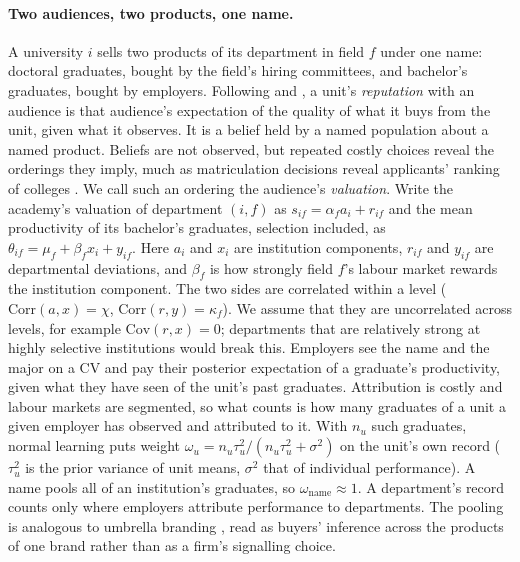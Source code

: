 \paragraph{Two audiences, two products, one name.} A university $i$ sells two products of its department in
field $f$ under one name: doctoral graduates, bought by the field's hiring committees, and bachelor's graduates,
bought by employers. Following \citet{macleod2015reputation} and \citet{tadelis1999name}, a unit's
\emph{reputation} with an audience is that audience's expectation of the quality of what it buys from the unit,
given what it observes. It is a belief held by a named population about a named product. Beliefs are not
observed, but repeated costly choices reveal the orderings they imply, much as matriculation decisions reveal
applicants' ranking of colleges \citep{avery2013revealed}. We call such an ordering the audience's
\emph{valuation}. Write the academy's valuation of department $(i,f)$ as $s_{if}=\alpha_fa_i+r_{if}$ and the mean
productivity of its bachelor's graduates, selection included, as $\theta_{if}=\mu_f+\beta_fx_i+y_{if}$. Here
$a_i$ and $x_i$ are institution components, $r_{if}$ and $y_{if}$ are departmental deviations, and $\beta_f$ is
how strongly field $f$'s labour market rewards the institution component. The two sides are correlated within a
level ($\mathrm{Corr}(a,x)=\chi$, $\mathrm{Corr}(r,y)=\kappa_f$). We assume that they are uncorrelated across
levels, for example $\mathrm{Cov}(r,x)=0$; departments that are relatively strong at highly selective
institutions would break this. Employers see the name and the major on a CV and pay their posterior expectation
of a graduate's productivity, given what they have seen of the unit's past graduates. Attribution is costly and
labour markets are segmented, so what counts is how many graduates of a unit a given employer has observed and
attributed to it. With $n_u$ such graduates, normal learning puts weight
$\omega_u=n_u\tau_u^2/(n_u\tau_u^2+\sigma^2)$ on the unit's own record ($\tau_u^2$ is the prior variance of unit
means, $\sigma^2$ that of individual performance). A name pools all of an institution's graduates, so
$\omega_{\text{name}}\approx1$. A department's record counts only where employers attribute performance to
departments. The pooling is analogous to umbrella branding \citep{wernerfelt1988umbrella}, read as buyers'
inference across the products of one brand \citep{choi1998brand,cabral2000stretching} rather than as a firm's
signalling choice.

